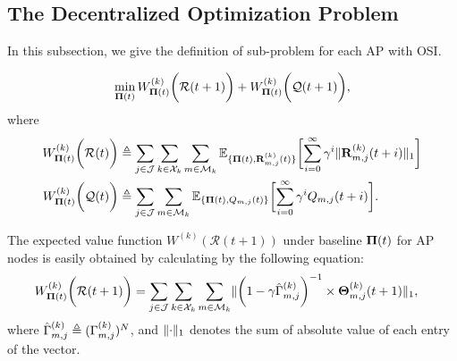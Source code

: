 \subsection{The Decentralized Optimization Problem}
In this subsection, we give the definition of sub-problem for each AP with OSI.
\begin{problem}
    \begin{align}
        \min_{\boldsymbol{\Pi}(t)} W^{(k)}_{\boldsymbol{\Pi}(t)}\bigg(\mathcal{R}(t+1)\bigg) + W^{(k)}_{\boldsymbol{\Pi}(t)}\bigg(\mathcal{Q}(t+1)\bigg),
        \label{eqn:partial}
    \end{align}
    where 
    \begin{align}
        W^{(k)}_{\Baseline(t)}\Paren{\mathcal{R}(t)}
            &\define \sum_{j\in\jSpace}\sum_{k\in\ccSet_{k}}\sum_{m\in\esSet_{k}}
            \mathbb{E}_{\{\Baseline(t), \vec{R}^{(k)}_{m,j}(t)\}}\Bracket{
                \sum_{i=0}^{\infty} \gamma^{i} \Inorm{\vec{R}^{(k)}_{m,j}({t+i})}
            }
        \\
        W^{(k)}_{\Baseline(t)}\Paren{\mathcal{Q}(t)}
            &\define \sum_{j\in\jSpace}\sum_{m\in\esSet_{k}}
            \mathbb{E}_{\{\Baseline(t), Q_{m,j}(t)\}}\Bracket{
                \sum_{i=0}^{\infty} \gamma^{i} Q_{m,j}({t+i})
            }.
    \end{align}
\end{problem}

The expected value function $W^{(k)}(\mathcal{R}(t+1))$ under baseline $\boldsymbol{\Pi}(t)$ for AP nodes is easily obtained by calculating by the following equation:
\begin{align}
    &W^{(k)}_{\boldsymbol{\Pi}(t)}\bigg(\mathcal{R}(t+1)\bigg) = \sum_{j\in\mathcal{J}}\sum_{k\in\mathcal{X}_{k}}\sum_{m\in\mathcal{M}_{k}}
    \lVert
        \bigg(1 - \gamma \hat{\Gamma}^{(k)}_{m,j}\bigg)^{-1}
        \times \boldsymbol{\Theta}^{(k)}_{m,j}(t+1)
    \|_1,
    \label{w_ap}
\end{align}
where $\hat{\Gamma}^{(k)}_{m,j} \triangleq (\Gamma^{(k)}_{m,j})^{N}$, and $\lVert\cdot\|_1$ denotes the sum of absolute value of each entry of the vector.

